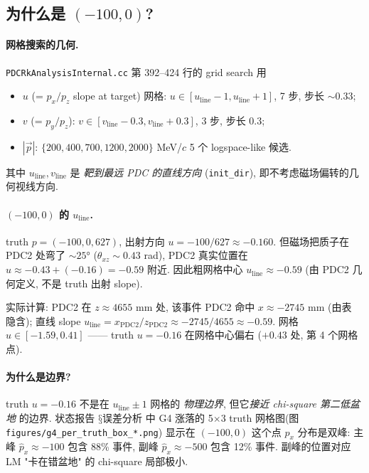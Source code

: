 \subsection{为什么是 $(-100, 0)$?}
\label{sec:partIII:basin:why}

\paragraph{网格搜索的几何.}
\texttt{PDCRkAnalysisInternal.cc} 第 392--424 行的 grid search 用
\begin{itemize}[nosep]
  \item $u$ (= $p_x / p_z$ slope at target) 网格: $u \in [u_{\mathrm{line}} - 1, u_{\mathrm{line}} + 1]$, 7 步, 步长 $\sim 0.33$;
  \item $v$ (= $p_y / p_z$): $v \in [v_{\mathrm{line}} - 0.3, v_{\mathrm{line}} + 0.3]$, 3 步, 步长 $0.3$;
  \item $|\vec p|$: $\{200, 400, 700, 1200, 2000\}$ MeV/$c$ 5 个 logspace-like 候选.
\end{itemize}
其中 $u_{\mathrm{line}}, v_{\mathrm{line}}$ 是 \emph{靶到最远 PDC 的直线方向} (\texttt{init\_dir}), 即不考虑磁场偏转的几何视线方向.

\paragraph{$(-100, 0)$ 的 $u_{\mathrm{line}}$.}
truth $p = (-100, 0, 627)$, 出射方向 $u = -100/627 \approx -0.160$. 但磁场把质子在 PDC2 处弯了 $\sim 25°$ ($\theta_{xz} \sim 0.43$ rad), PDC2 真实位置在 $u \approx -0.43 + (-0.16) = -0.59$ 附近. 因此粗网格中心 $u_{\mathrm{line}} \approx -0.59$ (由 PDC2 几何定义, 不是 truth 出射 slope).

实际计算: PDC2 在 $z \approx 4655$ mm 处, 该事件 PDC2 命中 $x \approx -2745$ mm (由表  隐含); 直线 slope $u_{\mathrm{line}} = x_{\mathrm{PDC2}} / z_{\mathrm{PDC2}} \approx -2745 / 4655 \approx -0.59$. 网格 $u \in [-1.59, 0.41]$ —— truth $u = -0.16$ 在网格中心偏右 ($+0.43$ 处, 第 4 个网格点).

\paragraph{为什么是边界?}
truth $u = -0.16$ 不是在 $u_{\mathrm{line}} \pm 1$ 网格的 \emph{物理边界}, 但它\emph{接近 chi-square 第二低盆地} 的边界. 状态报告 $§误差分析$ 中 G4 涨落的 5$\times$3 truth 网格图(图 \texttt{figures/g4\_per\_truth\_box\_*.png}) 显示在 $(-100, 0)$ 这个点 $\hat p_x$ 分布是双峰: 主峰 $\hat p_x \approx -100$ 包含 88\% 事件, 副峰 $\hat p_x \approx -500$ 包含 12\% 事件. 副峰的位置对应 LM "卡在错盆地" 的 chi-square 局部极小.

